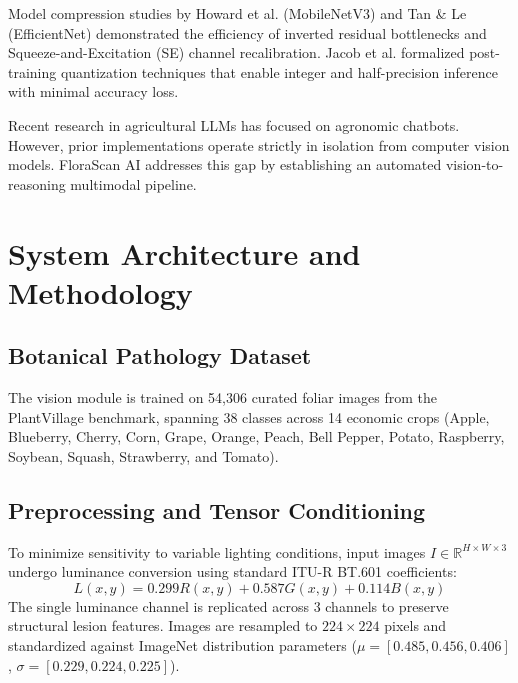 \documentclass[conference]{IEEEtran}
\begin{document}
Model compression studies by Howard et al. (MobileNetV3) and Tan \& Le (EfficientNet) demonstrated the efficiency of inverted residual bottlenecks and Squeeze-and-Excitation (SE) channel recalibration. Jacob et al. formalized post-training quantization techniques that enable integer and half-precision inference with minimal accuracy loss.

Recent research in agricultural LLMs has focused on agronomic chatbots. However, prior implementations operate strictly in isolation from computer vision models. FloraScan AI addresses this gap by establishing an automated vision-to-reasoning multimodal pipeline.

\section{System Architecture and Methodology}

\subsection{Botanical Pathology Dataset}
The vision module is trained on 54,306 curated foliar images from the PlantVillage benchmark, spanning 38 classes across 14 economic crops (Apple, Blueberry, Cherry, Corn, Grape, Orange, Peach, Bell Pepper, Potato, Raspberry, Soybean, Squash, Strawberry, and Tomato).

\subsection{Preprocessing and Tensor Conditioning}
To minimize sensitivity to variable lighting conditions, input images $I \in \mathbb{R}^{H \times W \times 3}$ undergo luminance conversion using standard ITU-R BT.601 coefficients:
\begin{equation}
L(x, y) = 0.299 R(x, y) + 0.587 G(x, y) + 0.114 B(x, y)
\end{equation}
The single luminance channel is replicated across 3 channels to preserve structural lesion features. Images are resampled to $224 \times 224$ pixels and standardized against ImageNet distribution parameters ($\mu = [0.485, 0.456, 0.406]$, $\sigma = [0.229, 0.224, 0.225]$).
\end{document}

